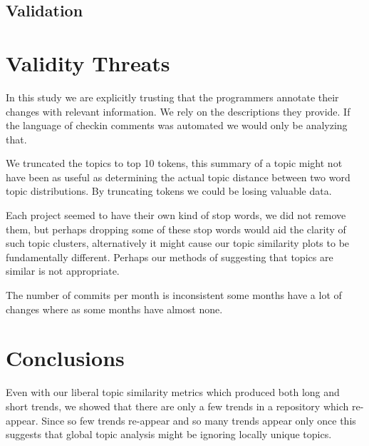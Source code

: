 \documentclass[times, 10pt,twocolumn]{article}
\begin{document}
\subsection{Validation}


\section{Validity Threats}

In this study we are explicitly trusting that the programmers annotate
their changes with relevant information. We rely on the descriptions
they provide. If the language of checkin comments was automated we
would only be analyzing that.

We truncated the topics to top 10 tokens, this summary of a topic
might not have been as useful as determining the actual topic distance
between two word topic distributions. By truncating tokens we could be
losing valuable data.

Each project seemed to have their own kind of stop words, we did not
remove them, but perhaps dropping some of these stop words would aid
the clarity of such topic clusters, alternatively it might cause our
topic similarity plots to be fundamentally different. Perhaps our
methods of suggesting that topics are similar is not appropriate.

The number of commits per month is inconsistent some months have a lot
of changes where as some months have almost none.






\section{Conclusions}

Even with our liberal topic similarity metrics which produced both
long and short trends, we showed that there are only a few trends in a
repository which re-appear. Since so few trends re-appear and so many
trends appear only once this suggests that global topic analysis might
be ignoring locally unique topics. 
\end{document}
